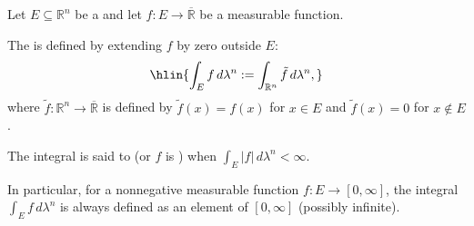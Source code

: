 \begin{definition} \label{definition:lebesgue_integral_over_a_measurable_subset_of_Rn}
    Let $E \subseteq \mathbb{R}^n$ be a  and let $f : E \to \overline{\mathbb{R}}$ be a measurable function.

    The  is defined by extending $f$ by zero outside $E$:
    $$\hlin{\int_E f\,d\lambda^n := \int_{\mathbb{R}^n} \tilde f\,d\lambda^n,}$$
    where $\tilde f : \mathbb{R}^n \to \overline{\mathbb{R}}$ is defined by $\tilde f(x) = f(x)$ for $x \in E$ and $\tilde f(x) = 0$ for $x \notin E$.

    The integral is said to  (or $f$ is ) when $\int_E |f|\,d\lambda^n < \infty$.

    In particular, for a nonnegative measurable function $f : E \to [0,\infty]$, the integral $\int_E f\,d\lambda^n$ is always defined as an element of $[0,\infty]$ (possibly infinite).
\end{definition}